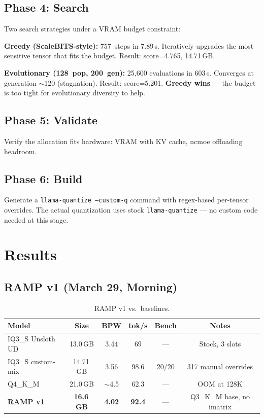 \documentclass[10pt,a4paper]{article}
\begin{document}
\subsection{Phase 4: Search}

Two search strategies under a VRAM budget constraint:

\textbf{Greedy (ScaleBITS-style):} 757~steps in 7.89\,s. Iteratively upgrades the most sensitive tensor that fits the budget. Result: score=4.765, 14.71\,GB.

\textbf{Evolutionary (128~pop, 200~gen):} 25{,}600 evaluations in 603\,s. Converges at generation $\sim$120 (stagnation). Result: score=5.201. \textbf{Greedy wins} --- the budget is too tight for evolutionary diversity to help.

\subsection{Phase 5: Validate}

Verify the allocation fits hardware: VRAM with KV cache, ncmoe offloading headroom.

\subsection{Phase 6: Build}

Generate a \texttt{llama-quantize --custom-q} command with regex-based per-tensor overrides. The actual quantization uses stock \texttt{llama-quantize} --- no custom code needed at this stage.

\section{Results}

\subsection{RAMP v1 (March 29, Morning)}

\begin{table}[h]
\centering
\caption{RAMP v1 vs.\ baselines.}
\begin{tabular}{lccccc}
\toprule
\textbf{Model} & \textbf{Size} & \textbf{BPW} & \textbf{tok/s} & \textbf{Bench} & \textbf{Notes} \\
\midrule
IQ3\_S Unsloth UD & 13.0\,GB & 3.44 & 69 & --- & Stock, 3 slots \\
IQ3\_S custom-mix & 14.71\,GB & 3.56 & 98.6 & 20/20 & 317 manual overrides \\
Q4\_K\_M & 21.0\,GB & $\sim$4.5 & 62.3 & --- & OOM at 128K \\
\textbf{RAMP v1} & \textbf{16.6\,GB} & \textbf{4.02} & \textbf{92.4} & --- & Q3\_K\_M base, no imatrix \\
\bottomrule
\end{tabular}
\end{table}
\end{document}
